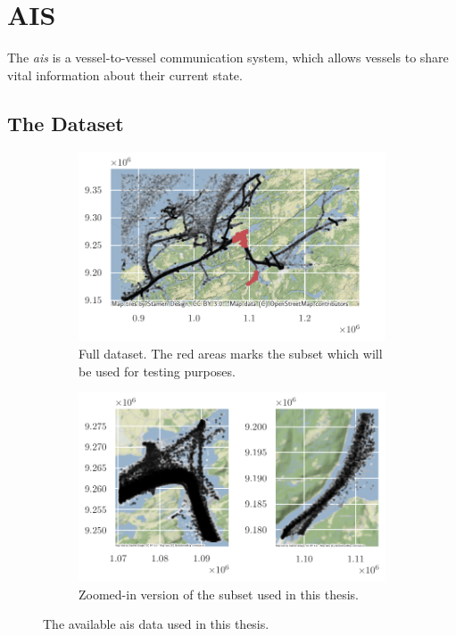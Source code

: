 \chapter{AIS}

The \textit{\acrfull{ais}} is a vessel-to-vessel communication system, which allows vessels to share vital information about their current state.

\section{The Dataset}

\begin{figure}[h]
    \centering
    \begin{subfigure}{\textwidth}
        \centering
        \includegraphics{figures/ais_map.pdf}
        \caption{Full dataset. The red areas marks the subset which will be used for testing purposes.}
    \end{subfigure}
    \begin{subfigure}{\textwidth}
        \centering
        \includegraphics{figures/ais_map_zoom.pdf}
        \caption{Zoomed-in version of the subset used in this thesis.}
    \end{subfigure}
    \caption{The available \acrshort{ais} data used in this thesis. }
\end{figure}


